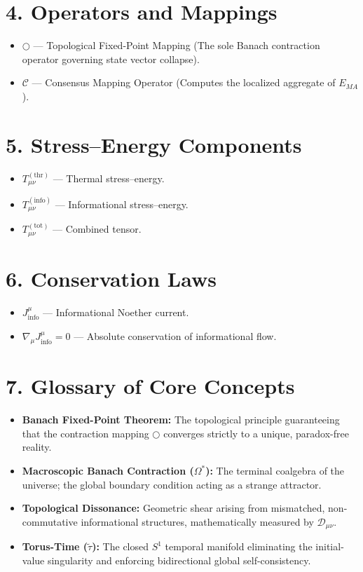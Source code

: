 \documentclass[12pt,openany]{book}
\theoremstyle{plain}
\theoremstyle{definition}
\theoremstyle{remark}
\begin{document}
\section*{4. Operators and Mappings}

\begin{itemize}
    \item $\bigcirc$ --- Topological Fixed-Point Mapping (The sole Banach contraction operator governing state vector collapse).  
    \item $\mathcal{C}$ --- Consensus Mapping Operator (Computes the localized aggregate of $E_{MA}$).  
\end{itemize}

\section*{5. Stress--Energy Components}

\begin{itemize}
    \item $T_{\mu\nu}^{(\text{thr})}$ — Thermal stress--energy.  
    \item $T_{\mu\nu}^{(\text{info})}$ — Informational stress--energy.  
    \item $T_{\mu\nu}^{(\text{tot})}$ — Combined tensor.  
\end{itemize}

\section*{6. Conservation Laws}

\begin{itemize}
    \item $J^\mu_{\text{info}}$ — Informational Noether current.  
    \item $\nabla_\mu J^\mu_{\text{info}} = 0$ — Absolute conservation of informational flow.  
\end{itemize}

\section*{7. Glossary of Core Concepts}

\begin{itemize}
    \item \textbf{Banach Fixed-Point Theorem:} The topological principle guaranteeing that the contraction mapping $\bigcirc$ converges strictly to a unique, paradox-free reality.  
    \item \textbf{Macroscopic Banach Contraction ($\Omega^*$):} The terminal coalgebra of the universe; the global boundary condition acting as a strange attractor.  
    \item \textbf{Topological Dissonance:} Geometric shear arising from mismatched, non-commutative informational structures, mathematically measured by $\mathcal{D}_{\mu\nu}$.  
    \item \textbf{Torus-Time ($\tilde{\tau}$):} The closed $S^1$ temporal manifold eliminating the initial-value singularity and enforcing bidirectional global self-consistency.  
\end{itemize}
\end{document}
